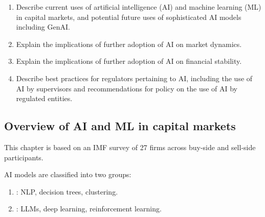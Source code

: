 
\begin{cikeybox}[title={The four objectives, in the spine's own words}]
\begin{enumerate}[label=\textbf{\alph*.}]
\item Describe current uses of artificial intelligence (AI) and machine learning (ML) in
capital markets, and potential future uses of sophisticated AI models including GenAI.
\item Explain the implications of further adoption of AI on market dynamics.
\item Explain the implications of further adoption of AI on financial stability.
\item Describe best practices for regulators pertaining to AI, including the use of AI by
supervisors and recommendations for policy on the use of AI by regulated entities.
\end{enumerate}
\end{cikeybox}


\subsection*{Overview of AI and ML in capital markets}

This chapter is based on an IMF survey of 27 firms across buy-side and sell-side
participants.

AI models are classified into two groups:

\begin{enumerate}
\item {}: NLP, decision trees, clustering.
\item {}: LLMs, deep learning, reinforcement learning.
\end{enumerate}

